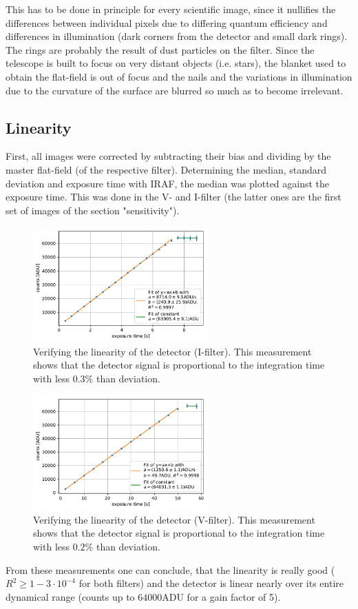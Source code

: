 \documentclass[12pt]{article}
\begin{document}
This has to be done in principle for every scientific image, since it nullifies the differences between individual pixels due to differing quantum efficiency and differences in illumination (dark corners from the detector and small dark rings). The rings are probably the result of dust particles on the filter. Since the telescope is built to focus on very distant objects (i.e. stars), the blanket used to obtain the flat-field is out of focus and the nails and the variations in illumination due to the curvature of the surface are blurred so much as to become irrelevant.
\subsection{Linearity}
	First, all images were corrected by subtracting their bias and dividing by the master flat-field (of the respective filter). Determining the median, standard deviation and exposure time with IRAF, the median was plotted against the exposure time. This was done in the V- and I-filter (the latter ones are the first set of images of the section "sensitivity").
	
\begin{figure}[H]
	\centering
	\includegraphics[width=0.6\textwidth]{figures/linearity_I.pdf}
	\caption{Verifying the linearity of the detector (I-filter). This measurement shows that the detector signal is proportional to the integration time with less $0.3\%$ than deviation.}
	\label{linearity_I}
\end{figure}
\begin{figure}[H]
	\centering
	\includegraphics[width=0.6\textwidth]{figures/linearity_V.pdf}
	\caption{Verifying the linearity of the detector (V-filter). This measurement shows that the detector signal is proportional to the integration time with less $0.2\%$ than deviation.}
	\label{linearity_V}
\end{figure}
	From these measurements one can conclude, that the linearity is really good ($R^2\geq 1-3\cdot 10^{-4}$ for both filters) and the detector is linear nearly over its entire dynamical range (counts up to $64000$ADU for a gain factor of 5).
\end{document}
